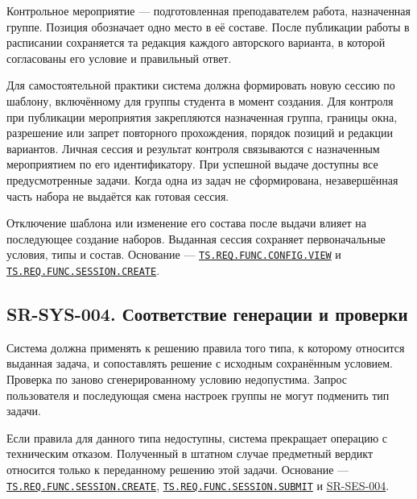 \documentclass[12pt,a4paper]{article}
\begin{document}
\hypertarget{sr-sys-003-согласованный-состав-набора}{}

\hypertarget{sr-sys-003}{}

Контрольное мероприятие --- подготовленная преподавателем работа, назначенная группе. Позиция обозначает одно место в её составе. После публикации работы в расписании сохраняется та редакция каждого авторского варианта, в которой согласованы его условие и правильный ответ.

Для самостоятельной практики система должна формировать новую сессию по шаблону, включённому для группы студента в момент создания. Для контроля при публикации мероприятия закрепляются назначенная группа, границы окна, разрешение или запрет повторного прохождения, порядок позиций и редакции вариантов. Личная сессия и результат контроля связываются с назначенным мероприятием по его идентификатору. При успешной выдаче доступны все предусмотренные задачи. Когда одна из задач не сформирована, незавершённая часть набора не выдаётся как готовая сессия.

Отключение шаблона или изменение его состава после выдачи влияет на последующее создание наборов. Выданная сессия сохраняет первоначальные условия, типы и состав. Основание --- {\href{../02\_Техническое\_задание/DOC-02\_Техническое\_задание.pdf\#ts-req-func-config-view}{\texttt{TS.\allowbreak{}REQ.\allowbreak{}FUNC.\allowbreak{}CONFIG.\allowbreak{}VIEW}}} и {\href{../02\_Техническое\_задание/DOC-02\_Техническое\_задание.pdf\#ts-req-func-session-create}{\texttt{TS.\allowbreak{}REQ.\allowbreak{}FUNC.\allowbreak{}SESSION.\allowbreak{}CREATE}}}.

\subsection{SR-SYS-004. Соответствие генерации и проверки}\label{sr-sys-004-ux441ux43eux43eux442ux432ux435ux442ux441ux442ux432ux438ux435-ux433ux435ux43dux435ux440ux430ux446ux438ux438-ux438-ux43fux440ux43eux432ux435ux440ux43aux438}

\hypertarget{sr-sys-004-соответствие-генерации-и-проверки}{}

\hypertarget{sr-sys-004}{}

Система должна применять к решению правила того типа, к которому относится выданная задача, и сопоставлять решение с исходным сохранённым условием. Проверка по заново сгенерированному условию недопустима. Запрос пользователя и последующая смена настроек группы не могут подменить тип задачи.

Если правила для данного типа недоступны, система прекращает операцию с техническим отказом. Полученный в штатном случае предметный вердикт относится только к переданному решению этой задачи. Основание --- {\href{../02\_Техническое\_задание/DOC-02\_Техническое\_задание.pdf\#ts-req-func-session-create}{\texttt{TS.\allowbreak{}REQ.\allowbreak{}FUNC.\allowbreak{}SESSION.\allowbreak{}CREATE}}}, {\href{../02\_Техническое\_задание/DOC-02\_Техническое\_задание.pdf\#ts-req-func-session-submit}{\texttt{TS.\allowbreak{}REQ.\allowbreak{}FUNC.\allowbreak{}SESSION.\allowbreak{}SUBMIT}}} и {\hyperlink{sr-ses-004}{SR-SES-004}}.
\end{document}
